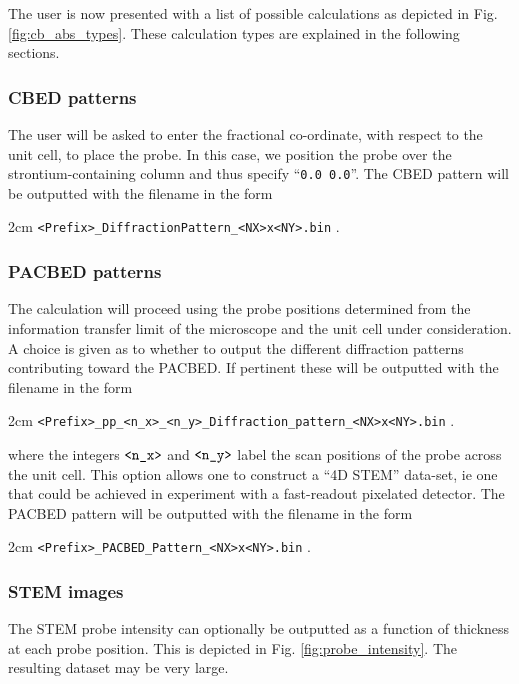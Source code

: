\documentclass[12pt,a4paper]{article}
\newenvironment{myenv}{\begin{samepage}\begin{adjustwidth}{2cm}{}}{\end{adjustwidth}\end{samepage}}
\begin{document}
The user is now presented with a list of possible calculations as depicted in Fig. \ref{fig:cb_abs_types}.
These calculation types are explained in the following sections.



\subsubsection{CBED patterns}

The user will be asked to enter the fractional co-ordinate, with respect to the unit cell, to place the probe.
In this case, we position the probe over the strontium-containing column and thus specify ``\verb|0.0 0.0|''.
The CBED pattern will be outputted with the filename in the form
%
\begin{myenv}
    \verb|<Prefix>_DiffractionPattern_<NX>x<NY>.bin| \; .
\end{myenv}
%



\subsubsection{PACBED patterns} 

The calculation will proceed using the probe positions determined from the information transfer limit of the microscope and the unit cell under consideration.
A choice is given as to whether to output the different diffraction patterns contributing toward the PACBED.
If pertinent these will be outputted with the filename in the form
%
\begin{myenv}
	\verb|<Prefix>_pp_<n_x>_<n_y>_Diffraction_pattern_<NX>x<NY>.bin| \; .
\end{myenv}
where the integers $\verb|<n_x>|$ and $\verb|<n_y>|$ label the scan positions of the probe across the unit cell.
This option allows one to construct a ``4D STEM'' data-set, ie one that could be achieved in experiment with a fast-readout pixelated detector.
The PACBED pattern will be outputted with the filename in the form
%
\begin{myenv}
    \verb|<Prefix>_PACBED_Pattern_<NX>x<NY>.bin| \; .
\end{myenv}



\subsubsection{STEM images}

The STEM probe intensity can optionally be outputted as a function of thickness at each probe position.
This is depicted in Fig. \ref{fig:probe_intensity}.
The resulting dataset may be very large.
\end{document}
